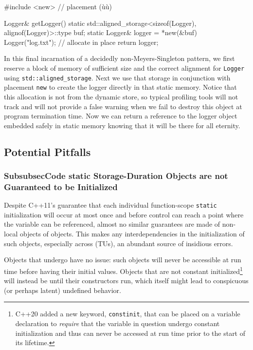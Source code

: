 \begin{emcppslisting}[emcppsbatch=e13]
#include <new>  // placement (ù{}ù)

Logger& getLogger()
{
    static std::aligned_storage<sizeof(Logger), alignof(Logger)>::type buf;
    static Logger& logger = *new(&buf) Logger("log.txt");  // allocate in place
    return logger;
}
\end{emcppslisting}

\noindent In this final incarnation of a decidedly non-Meyers-Singleton pattern,
we first reserve a block of memory of sufficient size and the correct
alignment for \lstinline!Logger! using \linebreak[4]%
\lstinline!std::aligned_storage!. Next
we use that storage in conjunction with placement \lstinline!new! to create
the logger directly in that static memory. Notice that this allocation
is not from the dynamic store, so typical profiling tools will not track
and will not provide a false warning when we fail to destroy this object
at program termination time. Now we can return a reference to the logger
object embedded safely in static memory knowing that it will be there
for all eternity.

\subsection[Potential Pitfalls]{Potential Pitfalls}\label{potential-pitfalls-functionstatic}

\subsubsection[\tt{static} Storage-Duration Objects are not Guaranteed to be Initialized]{{SubsubsecCode static} Storage-Duration Objects are not Guaranteed to be Initialized}\label{static-storage-duration-objects-are-not-guaranteed-to-be-initialized}

Despite C++11's guarantee that each individual function-scope
\lstinline!static! initialization will occur at most once and before control can reach
a point where the variable can be referenced, almost no similar
guarantees are made of non-local objects of  objects.
This makes any interdependencies in the initialization of such objects, especially across
 (TUs), an abundant source of insidious
errors.

Objects that undergo  have no issue:
such objects will never be accessible at run time before having their
initial values. Objects that are not constant
initialized{\cprotect\footnote{C++20 added a new keyword,
\lstinline!constinit!, that can be placed on a variable declaration to
\emph{require} that the variable in question undergo constant
initialization and thus can never be accessed at run time prior to the
  start of its lifetime.}} will instead be 
until their constructors run, which itself might lead to conspicuous (or
perhaps latent) undefined behavior.

